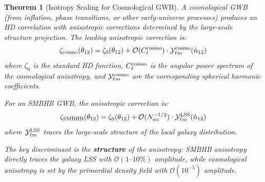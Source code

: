 \documentclass[11pt,a4paper]{article}
\newtheorem{theorem}{Theorem}[section]
\begin{document}
\begin{theorem}[Isotropy Scaling for Cosmological GWB]\label{thm:isotropy}
A cosmological GWB (from inflation, phase transitions, or other early-universe processes) produces an HD correlation with anisotropic corrections determined by the large-scale structure projection. The leading anisotropic correction is:
\begin{equation}
\zeta_{\rm cosmo}(\theta_{12}) = \zeta_0(\theta_{12}) + \mathcal{O}(C_\ell^{\rm cosmo}) \cdot \mathcal{Y}_{\ell m}^{\rm cosmo}(\hat{n}_{12})
\end{equation}
where $\zeta_0$ is the standard HD function, $C_\ell^{\rm cosmo}$ is the angular power spectrum of the cosmological anisotropy, and $\mathcal{Y}_{\ell m}^{\rm cosmo}$ are the corresponding spherical harmonic coefficients.

For an SMBHB GWB, the anisotropic correction is:
\begin{equation}
\zeta_{\rm SMBHB}(\theta_{12}) = \zeta_0(\theta_{12}) + \mathcal{O}(N_{\rm src}^{-1/2}) \cdot \mathcal{Y}_{\ell m}^{\rm LSS}(\hat{n}_{12})
\end{equation}
where $\mathcal{Y}_{\ell m}^{\rm LSS}$ traces the large-scale structure of the local galaxy distribution.

The key discriminant is the \textbf{structure} of the anisotropy: SMBHB anisotropy directly traces the galaxy LSS with $\mathcal{O}(1\text{--}10\%)$ amplitude, while cosmological anisotropy is set by the primordial density field with $\mathcal{O}(10^{-5})$ amplitude.
\end{theorem}
\end{document}
